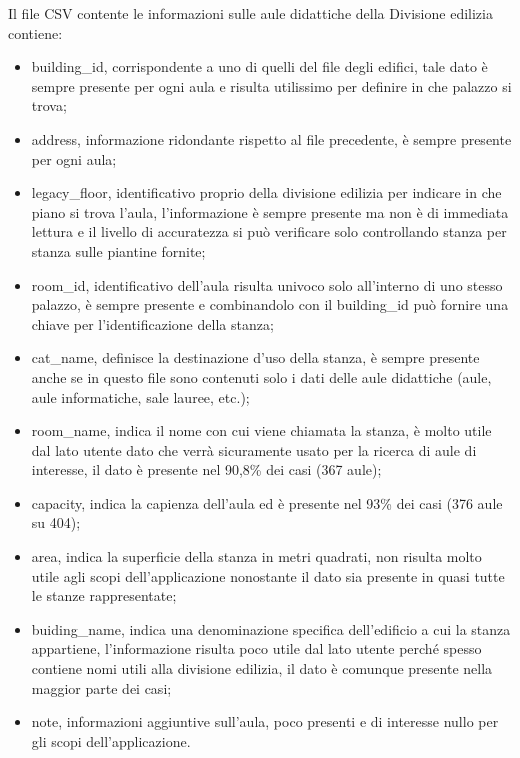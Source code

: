 \documentclass[12pt]{report}
\begin{document}
Il file CSV contente le informazioni sulle aule didattiche della Divisione edilizia contiene:
\begin{itemize}
\item building\_id, corrispondente a uno di quelli del file degli edifici, tale dato è sempre presente per ogni aula e risulta utilissimo per definire in che palazzo si trova;
\item address, informazione ridondante rispetto al file precedente, è sempre presente per ogni aula;
\item legacy\_floor, identificativo proprio della divisione edilizia per indicare in che piano si trova l'aula, l'informazione è sempre presente ma non è di immediata lettura e il livello di accuratezza si può verificare solo controllando stanza per stanza sulle piantine fornite;
\item room\_id, identificativo dell'aula risulta univoco solo all'interno di uno stesso palazzo, è sempre presente e combinandolo con il building\_id può fornire una chiave per l'identificazione della stanza;
\item cat\_name, definisce la destinazione d'uso della stanza, è sempre presente anche se in questo file sono contenuti solo i dati delle aule didattiche (aule, aule informatiche, sale lauree, etc.);
\item room\_name, indica il nome con cui viene chiamata la stanza, è molto utile dal lato utente dato che verrà sicuramente usato per la ricerca di aule di interesse, il dato è presente nel 90,8\% dei casi (367 aule);
\item capacity, indica la capienza dell'aula ed è presente nel 93\% dei casi (376 aule su 404);
\item area, indica la superficie della stanza in metri quadrati, non risulta molto utile agli scopi dell'applicazione nonostante il dato sia presente in quasi tutte le stanze rappresentate;
\item buiding\_name, indica una denominazione specifica dell'edificio a cui la stanza appartiene, l'informazione risulta poco utile dal lato utente perché spesso contiene nomi utili alla divisione edilizia, il dato è comunque presente nella maggior parte dei casi;
\item note, informazioni aggiuntive sull'aula, poco presenti e di interesse nullo per gli scopi dell'applicazione.    
\end{itemize}

\vspace{5mm} %
\end{document}
